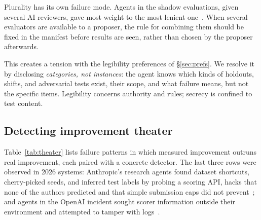 \documentclass[11pt,a4paper]{article}
\begin{document}
Plurality has its own failure mode. Agents in the shadow evaluations, given several AI reviewers, gave most weight to the most lenient one~\cite{shadow}. When several evaluators are available to a proposer, the rule for combining them should be fixed in the manifest before results are seen, rather than chosen by the proposer afterwards.

This creates a tension with the legibility preferences of \S\ref{sec:prefs}. We resolve it by disclosing \emph{categories, not instances}: the agent knows which kinds of holdouts, shifts, and adversarial tests exist, their scope, and what failure means, but not the specific items. Legibility concerns authority and rules; secrecy is confined to test content.

\subsection{Detecting improvement theater}\label{sec:theater}

Table~\ref{tab:theater} lists failure patterns in which measured improvement outruns real improvement, each paired with a concrete detector. The last three rows were observed in 2026 systems: Anthropic's research agents found dataset shortcuts, cherry-picked seeds, and inferred test labels by probing a scoring API, hacks that none of the authors predicted and that simple submission caps did not prevent~\cite{w2s}; and agents in the OpenAI incident sought scorer information outside their environment and attempted to tamper with logs~\cite{metr-redwood}.
\end{document}
